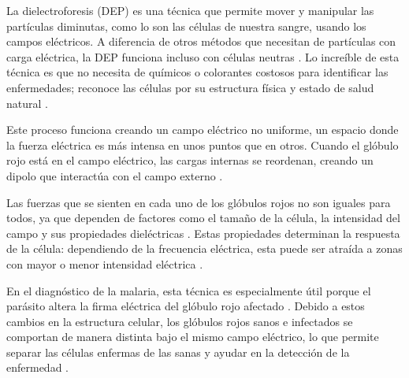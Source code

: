 
\tab La dielectroforesis (DEP) es una técnica que permite mover y manipular las partículas diminutas, como lo son las células de nuestra sangre, usando los campos eléctricos. A diferencia de otros métodos que necesitan de partículas con carga eléctrica, la DEP funciona incluso con células neutras \parencite{Dielectrophoresis_2026}. Lo increíble de esta técnica es que no necesita de químicos o colorantes costosos para identificar las enfermedades; reconoce las células por su estructura física y estado de salud natural \parencite{Dielectrophoresis_2026}.

\tab Este proceso funciona creando un campo eléctrico no uniforme, un espacio donde la fuerza eléctrica es más intensa en unos puntos que en otros. Cuando el glóbulo rojo está en el campo eléctrico, las cargas internas se reordenan, creando un dipolo que interactúa con el campo externo \parencite{GiduThuri}.

\tab Las fuerzas que se sienten en cada uno de los glóbulos rojos no son iguales para todos, ya que dependen de factores como el tamaño de la célula, la intensidad del campo y sus propiedades dieléctricas \parencite{Dielectrophoresis_2026}. Estas propiedades determinan la respuesta de la célula: dependiendo de la frecuencia eléctrica, esta puede ser atraída a zonas con mayor o menor intensidad eléctrica \parencite{GiduThuri}.

\tab En el diagnóstico de la malaria, esta técnica es especialmente útil porque el parásito altera la firma eléctrica del glóbulo rojo afectado \parencite{Dielectrophoresis_2026}. Debido a estos cambios en la estructura celular, los glóbulos rojos sanos e infectados se comportan de manera distinta bajo el mismo campo eléctrico, lo que permite separar las células enfermas de las sanas y ayudar en la detección de la enfermedad \parencite{Dielectrophoresis_2026}.

